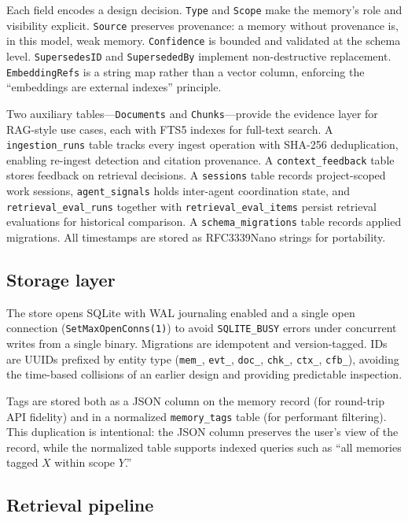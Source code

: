 \documentclass[11pt,a4paper]{article}
\begin{document}
Each field encodes a design decision. \texttt{Type} and \texttt{Scope} make the memory's role and visibility explicit. \texttt{Source} preserves provenance: a memory without provenance is, in this model, weak memory. \texttt{Confidence} is bounded and validated at the schema level. \texttt{SupersedesID} and \texttt{SupersededBy} implement non-destructive replacement. \texttt{EmbeddingRefs} is a string map rather than a vector column, enforcing the ``embeddings are external indexes'' principle.

Two auxiliary tables---\texttt{Documents} and \texttt{Chunks}---provide the evidence layer for RAG-style use cases, each with FTS5 indexes for full-text search. A \texttt{ingestion\_runs} table tracks every ingest operation with SHA-256 deduplication, enabling re-ingest detection and citation provenance. A \texttt{context\_feedback} table stores feedback on retrieval decisions. A \texttt{sessions} table records project-scoped work sessions, \texttt{agent\_signals} holds inter-agent coordination state, and \texttt{retrieval\_eval\_runs} together with \texttt{retrieval\_eval\_items} persist retrieval evaluations for historical comparison. A \texttt{schema\_migrations} table records applied migrations. All timestamps are stored as RFC3339Nano strings for portability.

\subsection{Storage layer}

The store opens SQLite with WAL journaling enabled and a single open connection (\texttt{SetMaxOpenConns(1)}) to avoid \texttt{SQLITE\_BUSY} errors under concurrent writes from a single binary. Migrations are idempotent and version-tagged. IDs are UUIDs prefixed by entity type (\texttt{mem\_}, \texttt{evt\_}, \texttt{doc\_}, \texttt{chk\_}, \texttt{ctx\_}, \texttt{cfb\_}), avoiding the time-based collisions of an earlier design and providing predictable inspection.

Tags are stored both as a JSON column on the memory record (for round-trip API fidelity) and in a normalized \texttt{memory\_tags} table (for performant filtering). This duplication is intentional: the JSON column preserves the user's view of the record, while the normalized table supports indexed queries such as ``all memories tagged $X$ within scope $Y$.''

\subsection{Retrieval pipeline}
\end{document}
